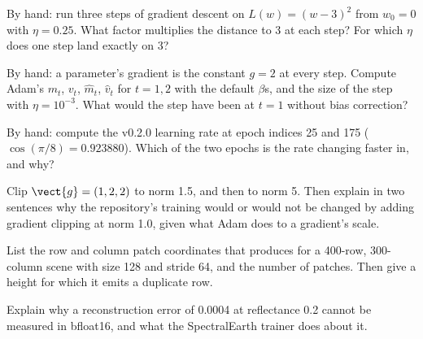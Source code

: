 \begin{checkyourself}
\item\label{ex:trainloop:1} By hand: run three steps of gradient descent on $L(w) = (w - 3)^2$
from $w_0 = 0$ with $\eta = 0.25$. What factor multiplies the distance to 3 at each step? For
which $\eta$ does one step land exactly on 3?
\item\label{ex:trainloop:2} By hand: a parameter's gradient is the constant $g = 2$ at every
step. Compute Adam's $m_t$, $v_t$, $\hat{m}_t$, $\hat{v}_t$ for $t = 1, 2$ with the default
$\beta$s, and the size of the step with $\eta = 10^{-3}$. What would the step have been at $t =
1$ without bias correction?
\item\label{ex:trainloop:3} By hand: compute the v0.2.0 learning rate at epoch indices 25 and
175 ($\cos(\pi/8) = 0.923880$). Which of the two epochs is the rate changing faster in, and why?
\item\label{ex:trainloop:4} Clip $\vect{g} = (1, 2, 2)$ to norm 1.5, and then to norm 5. Then
explain in two sentences why the repository's training would or would not be changed by adding
gradient clipping at norm 1.0, given what Adam does to a gradient's scale.
\item\label{ex:trainloop:5} List the row and column patch coordinates that
 produces for a 400-row, 300-column scene with size 128 and stride 64,
and the number of patches. Then give a height for which it emits a duplicate row.
\item\label{ex:trainloop:6} Explain why a reconstruction error of 0.0004 at reflectance 0.2
cannot be measured in bfloat16, and what the SpectralEarth trainer does about it.
\end{checkyourself}

\par\endgroup
